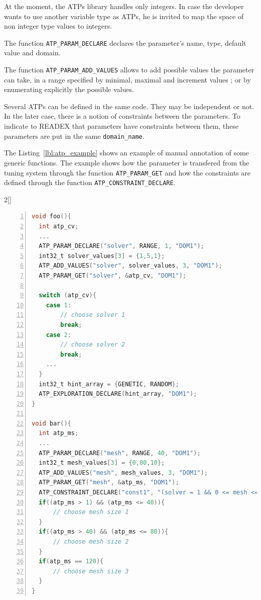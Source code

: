 At the moment, the ATPs library handles only integers. In case the developer wants to use another variable 
type as ATPs, he is invited to map the space of non integer type values to integers.

The function \texttt{ATP\_PARAM\_DECLARE} declares the parameter's name, type, default value and domain.

The function \texttt{ATP\_PARAM\_ADD\_VALUES} allows to add possible values the parameter can take, in a range specified by 
minimal, maximal and increment values ; or by enumerating explicitly the possible values.

Several ATPs can be defined in the same code. They may be independent or not. In the later case, there is a 
notion of constraints between the parameters. To indicate to READEX that parameters have constraints between them, 
these parameters are put in the same \texttt{domain\_name}.

The Listing~\ref{lbl:atp_example} shows an example of manual annotation of some generic functions. The example shows how 
the parameter is transfered from the tuning system through the function \texttt{ATP\_PARAM\_GET} and how the constraints are 
defined through the function \texttt{ATP\_CONSTRAINT\_DECLARE}.

\vspace{0.4cm}
\begin{minipage}{\linewidth}
\begin{multicols}{2}[]
\begin{lstlisting}[language=C,numbers=left,numberstyle=\tiny,xleftmargin=3em,frame=none,title=\phantom{xxx},label=lbl:atp_example]
void foo(){
  int atp_cv;
  ...
  ATP_PARAM_DECLARE("solver", RANGE, 1, "DOM1");
  int32_t solver_values[3] = {1,5,1};
  ATP_ADD_VALUES("solver", solver_values, 3, "DOM1");
  ATP_PARAM_GET("solver", &atp_cv, "DOM1");

  switch (atp_cv){
    case 1:
        // choose solver 1
        break;
    case 2:
        // choose solver 2
        break;
    ...
  }
  int32_t hint_array = {GENETIC, RANDOM};
  ATP_EXPLORATION_DECLARE(hint_array, "DOM1");
}

void bar(){
  int atp_ms;
  ...
  ATP_PARAM_DECLARE("mesh", RANGE, 40, "DOM1");
  int32_t mesh_values[3] = {0,80,10};
  ATP_ADD_VALUES("mesh", mesh_values, 3, "DOM1");
  ATP_PARAM_GET("mesh", &atp_ms, "DOM1");
  ATP_CONSTRAINT_DECLARE("const1", "(solver = 1 && 0 <= mesh <= 40) || (solver = 2 && 40 <= mesh <= 80) || (solver > 2 && mesh = 120)", "DOM1");
  if((atp_ms > 1) && (atp_ms <= 40)){
      // choose mesh size 1
  }
  if((atp_ms > 40) && (atp_ms <= 80)){
      // choose mesh size 2
  }
  if(atp_ms == 120){
      // choose mesh size 3
  }
}
\end{lstlisting}
\end{multicols}
\end{minipage}
\vspace{0.4cm}

